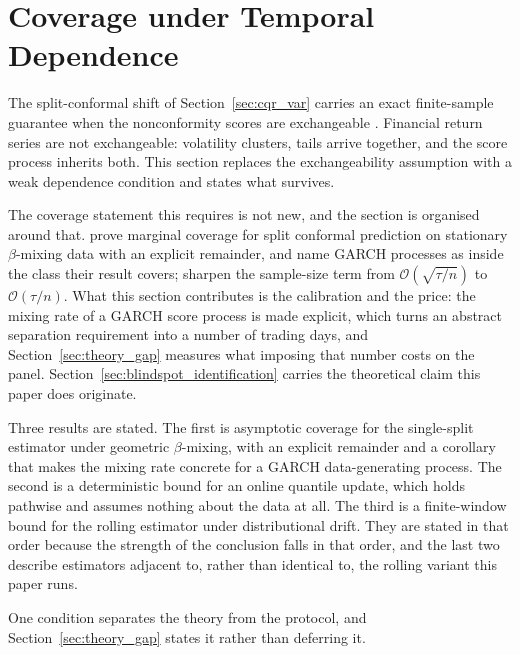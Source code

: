 \section{Coverage under Temporal Dependence}
\label{sec:theory}

The split-conformal shift of Section~\ref{sec:cqr_var} carries an exact
finite-sample guarantee when the nonconformity scores are exchangeable
\citep{vovk2005algorithmic,lei2018distribution}. Financial return series are not
exchangeable: volatility clusters, tails arrive together, and the score process
inherits both. This section replaces the exchangeability assumption with a weak
dependence condition and states what survives.

The coverage statement this requires is not new, and the section is organised
around that. \citet{oliveira2024split} prove marginal coverage for split
conformal prediction on stationary $\beta$-mixing data with an explicit
remainder, and name GARCH processes as inside the class their result covers;
\citet{barber2026predictive} sharpen the sample-size term from
$\mathcal O(\sqrt{\tau/n})$ to $\mathcal O(\tau/n)$. What this section
contributes is the calibration and the price: the mixing rate of a GARCH score
process is made explicit, which turns an abstract separation requirement into a
number of trading days, and Section~\ref{sec:theory_gap} measures what imposing
that number costs on the panel. Section~\ref{sec:blindspot_identification}
carries the theoretical claim this paper does originate.

Three results are stated. The first is asymptotic coverage for the single-split
estimator under geometric $\beta$-mixing, with an explicit remainder and a
corollary that makes the mixing rate concrete for a GARCH data-generating
process. The second is a deterministic bound for an online quantile update, which
holds pathwise and assumes nothing about the data at all. The third is a
finite-window bound for the rolling estimator under distributional drift. They
are stated in that order because the strength of the conclusion falls in that
order, and the last two describe estimators adjacent to, rather than identical
to, the rolling variant this paper runs.

One condition separates the theory from the protocol, and
Section~\ref{sec:theory_gap} states it rather than deferring it.

